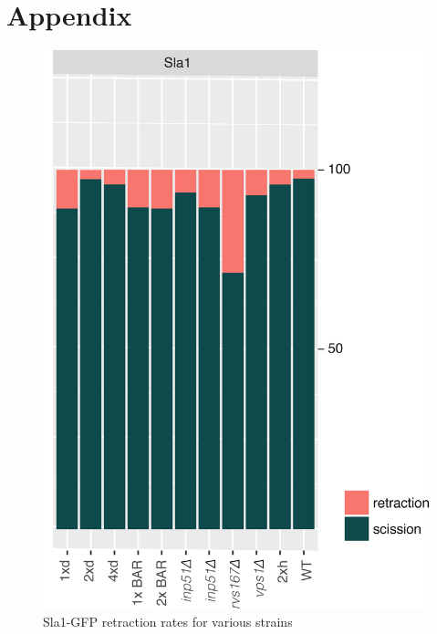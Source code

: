 \chapter{Appendix} %
\pagestyle{plain}
\label{Ch:Appendix}


\begin{figure}[H]
	\centering
	\vspace{2cm}
\includegraphics[scale=1]{figures/appendix/retraction_rates_all}
\caption[Scission failure rates]{Sla1-GFP retraction rates for various strains}
\end{figure}


